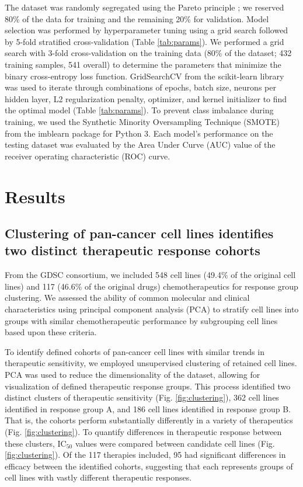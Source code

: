 \documentclass[10pt, letterpaper, twocolumn]{article}
\begin{document}
The dataset was randomly segregated using the Pareto principle \cite{pareto}; we reserved 80\% of the data for training and the remaining 20\% for validation. Model selection was performed by hyperparameter tuning using a grid search followed by 5-fold stratified cross-validation (Table \ref{tab:params}). We performed a grid search with 3-fold cross-validation on the training data (80\% of the dataset; 432 training samples, 541 overall) to determine the parameters that minimize the binary cross-entropy loss function. GridSearchCV from the scikit-learn library \cite{scikit-learn} was used to iterate through combinations of epochs, batch size, neurons per hidden layer, L2 regularization penalty, optimizer, and kernel initializer to find the optimal model (Table \ref{tab:params}). To prevent class imbalance during training, we used the Synthetic Minority Oversampling Technique (SMOTE) from the imblearn package \cite{imblearn} for Python 3. Each model’s performance on the testing dataset was evaluated by the Area Under Curve (AUC) value of the receiver operating characteristic (ROC) curve.


\section{Results}
\subsection{Clustering of pan-cancer cell lines identifies two distinct therapeutic response cohorts}
From the GDSC consortium, we included 548 cell lines (49.4\% of the original cell lines) and 117 (46.6\% of the original drugs) chemotherapeutics for response group clustering. We assessed the ability of common molecular and clinical characteristics using principal component analysis (PCA) to stratify cell lines into groups with similar chemotherapeutic performance by subgrouping cell lines based upon these criteria.

To identify defined cohorts of pan-cancer cell lines with similar trends in therapeutic sensitivity, we employed unsupervised clustering of retained cell lines. PCA was used to reduce the dimensionality of the dataset, allowing for visualization of defined therapeutic response groups. This process identified two distinct clusters of therapeutic sensitivity (Fig. \ref{fig:clustering}), 362 cell lines identified in response group A, and 186 cell lines identified in response group B. That is, the cohorts perform substantially differently in a variety of therapeutics (Fig. \ref{fig:clustering}). To quantify differences in therapeutic response between these clusters, IC$_{50}$ values were compared between candidate cell lines (Fig. \ref{fig:clustering}). Of the 117 therapies included, 95 had significant differences in efficacy between the identified cohorts, suggesting that each represents groups of cell lines with vastly different therapeutic responses.
\end{document}
